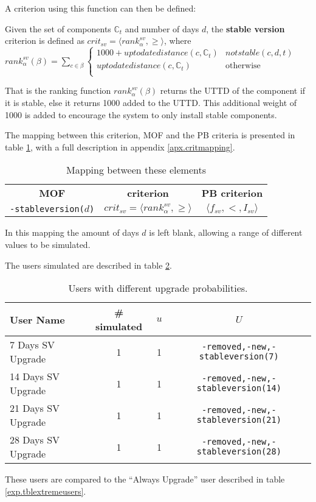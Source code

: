 A criterion using this function can then be defined:
\begin{defs}
	Given the set of components $\mathbb{C}_t$ and number of days $d$, the \textbf{stable version} criterion is defined as $crit_{sv} = \langle rank^{sv}_{\alpha}, \geq \rangle$,
	where \\$rank^{sv}_{\alpha}(\beta) = \sum_{c \in \beta} \begin{cases} 1000 + uptodatedistance(c,\mathbb{C}_t)& not stable(c,d,t) \\ uptodatedistance(c,\mathbb{C}_t) & \text{otherwise} \\  \end{cases}$
\end{defs}
That is the ranking function $rank^{sv}_{\alpha}(\beta)$ returns the UTTD of the component if it is stable,
else it returns 1000 added to the UTTD.
This additional weight of 1000 is added to encourage the system to only install stable components.

The mapping between this criterion, MOF and the PB criteria is presented in table \ref{exp.stablcritmapping}, with a full description in appendix \ref{apx.critmapping}.
\begin{table}[htp]
\begin{tabular}{c | c | c}
\textbf{MOF} 		& \textbf{\modelname criterion} & \textbf{PB criterion} \\
\texttt{-stableversion(}$d$\texttt{)} & $crit_{sv} = \langle rank^{sv}_{\alpha}, \geq \rangle$ & $\langle f_{sv}, <, I_{sv} \rangle$ \\
\end{tabular}
\caption{Mapping between these elements}
\label{exp.stablcritmapping}
\end{table}
In this mapping the amount of days $d$ is left blank, allowing a range of different values to be simulated.

The users simulated are described in table \ref{exp.tblsvusers}.
\begin{table}[h!]
\centering
\begin{tabular}{|l | c | c | c | }
\hline
User Name 				& \# simulated 	& $u$ 	& $U$ 			\\ \hline
7 Days SV Upgrade		& 1 			& 1 & 	\texttt{-removed,-new,-stableversion(7)}			 \\
14 Days SV Upgrade		& 1 			& 1 & 	\texttt{-removed,-new,-stableversion(14)}			\\
21 Days SV Upgrade		& 1 			& 1 & 	\texttt{-removed,-new,-stableversion(21)}			 \\
28 Days SV Upgrade 		& 1 			& 1 & 	\texttt{-removed,-new,-stableversion(28)}			\\ \hline
\end{tabular}
\caption{Users with different upgrade probabilities.}
\label{exp.tblsvusers}
\end{table}
These users are compared to the ``Always Upgrade'' user described in table \ref{exp.tblextremeusers}.

